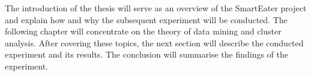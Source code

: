 \documentclass[12pt,a4paper]{article}
\begin{document}
The introduction of the thesis will serve as an overview of the SmartEater project and explain how and why the subsequent experiment will be conducted. The following chapter will concentrate on the theory of data mining and cluster analysis. After covering these topics, the next section will describe the conducted experiment and its results. The conclusion will summarise the findings of the experiment.



















\end{document}
